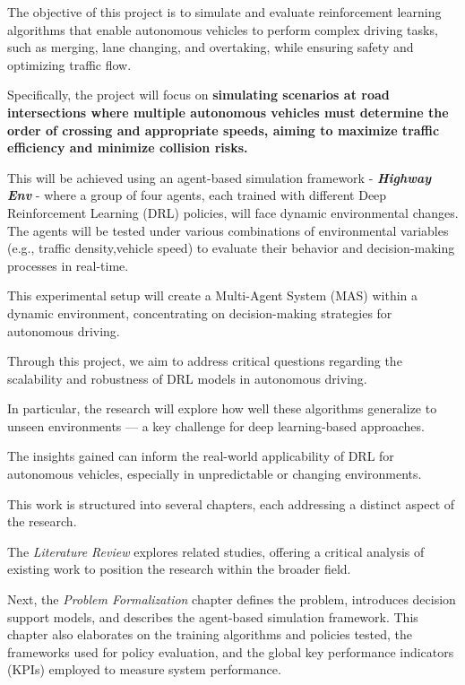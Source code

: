 

The objective of this project is to simulate and evaluate reinforcement learning algorithms that enable autonomous vehicles to perform complex driving tasks,
such as merging, lane changing, and overtaking, while ensuring safety and optimizing traffic flow.

Specifically, the project will focus on \textbf{simulating scenarios at road intersections where multiple autonomous vehicles must determine the order of crossing
and appropriate speeds, aiming to maximize traffic efficiency and minimize collision risks.}

This will be achieved using an agent-based simulation framework - \textbf{\textit{Highway Env}}\cite{highwayenv} - where a group of four agents, each trained with different Deep Reinforcement Learning (DRL) policies, will face dynamic environmental changes. The agents will
be tested under various combinations of environmental variables (e.g., traffic density,vehicle speed) to evaluate their behavior and decision-making processes in real-time. 

This experimental setup will create a Multi-Agent System (MAS) within a dynamic environment, concentrating on decision-making strategies for autonomous driving.

Through this project, we aim to address critical questions regarding the scalability and robustness of DRL models in autonomous driving. 

In particular, the research will explore how well these algorithms generalize to unseen environments — a key challenge for deep learning-based approaches. 

The insights gained can inform the real-world applicability of DRL for autonomous vehicles, especially in unpredictable or changing environments.

This work is structured into several chapters, each addressing a distinct aspect of the research. 

The \textit{Literature Review} explores related studies, offering a critical analysis of existing work to position the research within the broader field. 

Next, the \textit{Problem Formalization} chapter defines the problem, introduces decision support models, and describes the agent-based simulation 
framework. 
This chapter also elaborates on the training algorithms and policies tested, the frameworks used for policy evaluation, 
and the global key performance indicators (KPIs) employed to measure system performance.

